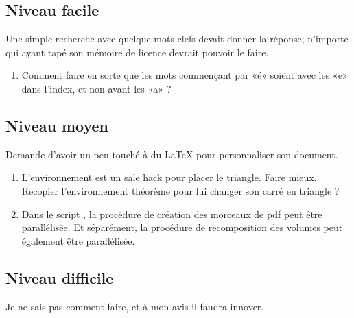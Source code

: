 \subsection{Niveau facile}

Une simple recherche avec quelque mots clefs devait donner la réponse; n'importe qui ayant tapé son mémoire de licence devrait pouvoir le faire.

\begin{enumerate}
    \item
        Comment faire en sorte que les mots commençant par «é» soient avec les «e» dans l'index, et non avant les «a» ?
\end{enumerate}

\subsection{Niveau moyen}

Demande d'avoir un peu touché à du \LaTeX{} pour personnaliser son document.

\begin{enumerate}
    \item 
        L'environnement  est un sale hack pour placer le triangle. Faire mieux. Recopier l'environnement théorème pour lui changer son carré en triangle ?
    \item
        Dans le script , la procédure de création des morceaux de pdf peut être parallélisée. Et séparément, la procédure de recomposition des volumes peut également être parallélisée.
\end{enumerate}

\subsection{Niveau difficile}

Je ne sais pas comment faire, et à mon avis il faudra innover.

